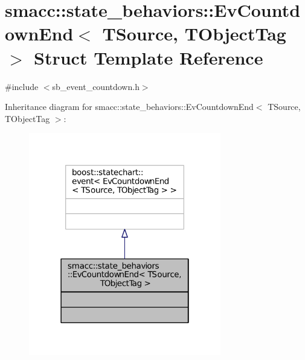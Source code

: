 \hypertarget{structsmacc_1_1state__behaviors_1_1EvCountdownEnd}{}\section{smacc\+:\+:state\+\_\+behaviors\+:\+:Ev\+Countdown\+End$<$ T\+Source, T\+Object\+Tag $>$ Struct Template Reference}
\label{structsmacc_1_1state__behaviors_1_1EvCountdownEnd}


{\ttfamily \#include $<$sb\+\_\+event\+\_\+countdown.\+h$>$}



Inheritance diagram for smacc\+:\+:state\+\_\+behaviors\+:\+:Ev\+Countdown\+End$<$ T\+Source, T\+Object\+Tag $>$\+:
\nopagebreak
\begin{figure}[H]
\begin{center}
\leavevmode
\includegraphics[width=238pt]{structsmacc_1_1state__behaviors_1_1EvCountdownEnd__inherit__graph}
\end{center}
\end{figure}


